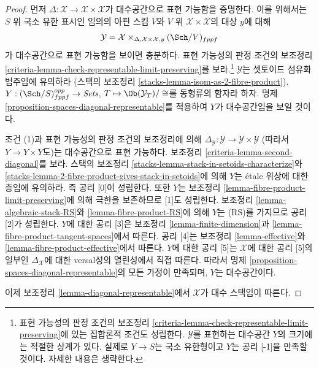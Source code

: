 \begin{proof}
먼저 $\Delta : \mathcal{X} \to \mathcal{X} \times \mathcal{X}$가
대수공간으로 표현 가능함을 증명한다. 이를 위해서는 $S$ 위 국소 유한
표시인 임의의 아핀 스킴 $V$와 $V$ 위 $\mathcal{X} \times \mathcal{X}$의
대상 $y$에 대해
$$
\mathcal{Y} =
\mathcal{X} \times_{\Delta, \mathcal{X} \times \mathcal{X}, y} (\Sch/V)_{fppf}
$$
가 대수공간으로 표현 가능함을 보이면 충분하다. 표현 가능성의 판정
조건의 보조정리
\ref{criteria-lemma-check-representable-limit-preserving}를
보라.\footnote{표현 가능성의 판정 조건의 보조정리
\ref{criteria-lemma-check-representable-limit-preserving}에 있는 집합론적
조건도 성립한다. $\mathcal{Y}$를 표현하는 대수공간 $Y$의 크기에는
적절한 상계가 있다. 실제로 $Y \to S$는 국소 유한형이고 $Y$는
공리 [-1]을 만족할 것이다. 자세한 내용은 생략한다.}
$\mathcal{Y}$는 셋토이드 섬유화 범주임에 유의하라
(스택의 보조정리 \ref{stacks-lemma-isom-as-2-fibre-product}).
$Y : (\Sch/S)_{fppf}^{opp} \to \textit{Sets}$,
$T \mapsto \Ob(\mathcal{Y}_T)/\cong$를 동형류의 함자라 하자.
명제 \ref{proposition-spaces-diagonal-representable}를 적용하여
$Y$가 대수공간임을 보일 것이다.

\medskip\noindent
조건 (1)과 표현 가능성의 판정 조건의 보조정리에 의해
$\Delta_\mathcal{Y} : \mathcal{Y} \to \mathcal{Y} \times \mathcal{Y}$
(따라서 $Y \to Y \times Y$도)는 대수공간으로 표현 가능하다.
보조정리 \ref{criteria-lemma-second-diagonal}를 보라.
스택의 보조정리 \ref{stacks-lemma-stack-in-setoids-characterize}와
\ref{stacks-lemma-2-fibre-product-gives-stack-in-setoids}에 의해
$Y$는 \'etale 위상에 대한 층임에 유의하라. 즉 공리 [0]이 성립한다.
또한 $Y$는 보조정리 \ref{lemma-fibre-product-limit-preserving}에 의해
극한을 보존하므로 [1]도 성립한다. 보조정리
\ref{lemma-algebraic-stack-RS}와 \ref{lemma-fibre-product-RS}에 의해
$Y$는 (RS)를 가지므로 공리 [2]가 성립한다.
$Y$에 대한 공리 [3]은 보조정리 \ref{lemma-finite-dimension}과
\ref{lemma-fibre-product-tangent-spaces}에서 따른다.
공리 [4]는 보조정리 \ref{lemma-effective}와
\ref{lemma-fibre-product-effective}에서 따른다.
$Y$에 대한 공리 [5]는 $\mathcal{X}$에 대한 공리 [5]의 일부인
$\Delta_\mathcal{X}$에 대한 versal성의 열린성에서 직접 따른다.
따라서 명제 \ref{proposition-spaces-diagonal-representable}의 모든
가정이 만족되며, $Y$는 대수공간이다.

\medskip\noindent
이제 보조정리 \ref{lemma-diagonal-representable}에서 $\mathcal{X}$가
대수 스택임이 따른다.
\end{proof}





